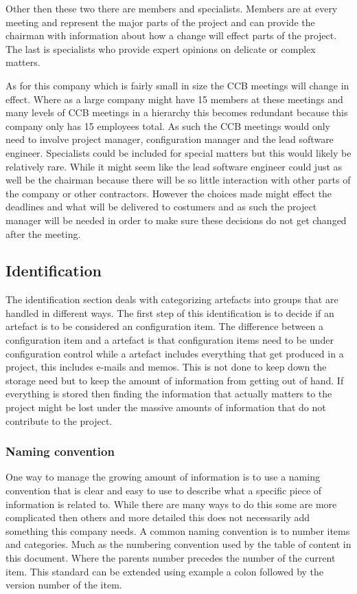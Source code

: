 \documentclass[a4paper]{article}
\begin{document}
Other then these two there are members and specialists. Members are at every meeting and represent the major parts of the project and can provide the chairman with information about how a change will effect parts of the project. The last is specialists who provide expert opinions on delicate or complex matters.

As for this company which is fairly small in size the CCB meetings will change in effect. Where as a large company might have 15 members at these meetings and many levels of CCB meetings in a hierarchy this becomes redundant because this company only has 15 employees total. As such the CCB meetings would only need to involve project manager, configuration manager and the lead software engineer. Specialists could be included for special matters but this would likely be relatively rare. While it might seem like the lead software engineer could just as well be the chairman because there will be so little interaction with other parts of the company or other contractors. However the choices made might effect the deadlines and what will be delivered to costumers and as such the project manager will be needed in order to make sure these decisions do not get changed after the meeting.

\subsection{Identification}
The identification section deals with categorizing artefacts into groups that are handled in different ways. The first step of this identification is to decide if an artefact is to be considered an configuration item. The difference between a configuration item and a artefact is that configuration items need to be under configuration control while a artefact includes everything that get produced in a project, this includes e-mails and memos. This is not done to keep down the storage need but to keep the amount of information from getting out of hand. If everything is stored then finding the information that actually matters to the project might be lost under the massive amounts of information that do not contribute to the project.

\subsubsection{Naming convention}
One way to manage the growing amount of information is to use a naming convention that is clear and easy to use to describe what a specific piece of information is related to. While there are many ways to do this some are more complicated then others and more detailed this does not necessarily add something this company needs. A common naming convention is to number items and categories. Much as the numbering convention used by the table of content in this document. Where the parents number precedes the number of the current item. This standard can be extended using example a colon followed by the version number of the item.
\end{document}
